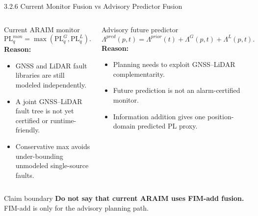 \documentclass[10pt,aspectratio=169,xcolor=dvipsnames]{beamer}
\newcommand{\PL}{\mathrm{PL}}
\begin{document}
\begin{frame}{3.2.6 Current Monitor Fusion vs Advisory Predictor Fusion}

  \small
  \begin{columns}[T]
    \begin{alertblock}{Current ARAIM monitor}
      \footnotesize
      \[
        \PL^{mon}_q=\max(\PL^G_q,\PL^L_q).
      \]
      \textbf{Reason:}
      \begin{itemize}\scriptsize
        \item GNSS and LiDAR fault libraries are still modeled independently.
        \item A joint GNSS--LiDAR fault tree is not yet certified or runtime-friendly.
        \item Conservative max avoids under-bounding unmodeled single-source faults.
      \end{itemize}
    \end{alertblock}
    \begin{exampleblock}{Advisory future predictor}
      \footnotesize
      \[
        \Lambda^{pred}(p,t)=\Lambda^{prior}(t)+\Lambda^G(p,t)+\Lambda^L(p,t).
      \]
      \textbf{Reason:}
      \begin{itemize}\scriptsize
        \item Planning needs to exploit GNSS--LiDAR complementarity.
        \item Future prediction is not an alarm-certified monitor.
        \item Information addition gives one position-domain predicted PL proxy.
      \end{itemize}
    \end{exampleblock}
  \end{columns}
  \begin{block}{Claim boundary}
    \footnotesize \textbf{Do not say that current ARAIM uses FIM-add fusion.} FIM-add is only for the advisory planning path.
  \end{block}

\end{frame}
\end{document}
